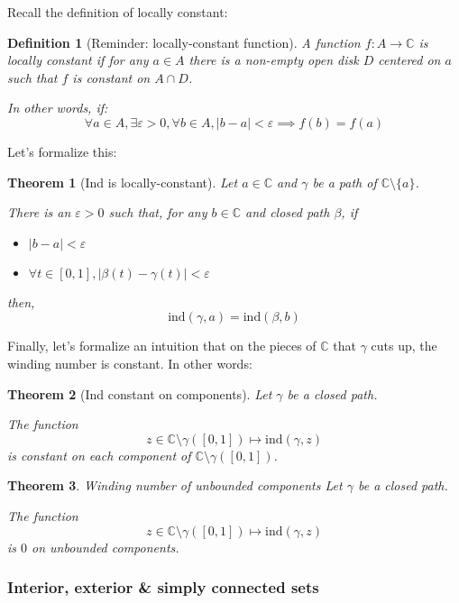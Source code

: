 \documentclass{article}
\newtheorem*{defi}{Definition}
\newtheorem*{thm*}{Theorem}
\begin{document}
Recall the definition of locally constant:

\begin{defi}[Reminder: locally-constant function]
    A function $f: A \rightarrow \mathbb{C}$ is locally constant if for any $a\in A$ there is a non-empty open disk $D$ centered on $a$ such that $f$ is constant on $A\cap D$.

    In other words, if:
    $$ \forall a \in A, \exists \varepsilon >0, \forall b \in A, |b-a|< \varepsilon \implies f(b) = f(a) $$
\end{defi}

Let's formalize this:

\begin{thm*}[Ind is locally-constant]
    Let $a\in\mathbb{C}$ and $\gamma$ be a path of $\mathbb{C} \setminus \lbrace a \rbrace$.
   
    There is an $\varepsilon > 0$ such that, for any $b\in \mathbb{C}$ and closed path $\beta$, if 
    \begin{itemize}
        \item $|b - a| < \varepsilon$
        \item $\forall t \in [0,1], |\beta(t) - \gamma(t)| < \varepsilon $
    \end{itemize}

    then, $$\mathrm{ind}(\gamma, a) = \mathrm{ind}(\beta, b)$$
\end{thm*}

Finally, let's formalize an intuition that on the pieces of $\mathbb{C}$ that $\gamma$ cuts up, the winding number is constant. In other words:

\begin{thm*}[Ind constant on components]
    Let $\gamma$ be a closed path.

    The function
    $$ z \in \mathbb{C} \setminus \gamma([0,1]) \mapsto \mathrm{ind}(\gamma, z) $$
    is constant on each component of $\mathbb{C}\setminus \gamma([0,1])$.
\end{thm*}

\begin{thm*}{Winding number of unbounded components}
    Let $\gamma$ be a closed path.

    The function
    $$ z \in \mathbb{C} \setminus \gamma([0,1]) \mapsto \mathrm{ind}(\gamma, z) $$
    is $0$ on unbounded components.
\end{thm*}

\subsubsection{Interior, exterior \& simply connected sets}
\end{document}
